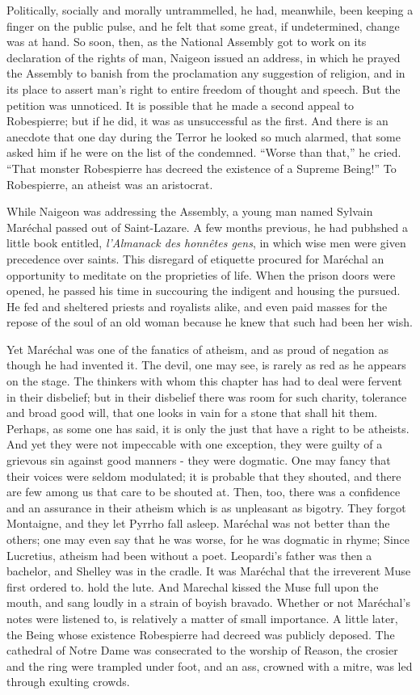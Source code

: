\documentclass[]{book}
\begin{document}
Politically, socially and morally untrammelled, he had, meanwhile, been
keeping a finger on the public pulse, and he felt that some great, if
undetermined, change was at hand. So soon, then, as the National
Assembly got to work on its declaration of the rights of man, Naigeon
issued an address, in which he prayed the Assembly to banish from the
proclamation any suggestion of religion, and in its place to assert
man's right to entire freedom of thought and speech. But the petition
was unnoticed. It is possible that he made a second appeal to
Robespierre; but if he did, it was as unsuccessful as the first. And
there is an anecdote that one day during the Terror he looked so much
alarmed, that some asked him if he were on the list of the condemned.
``Worse than that,'' he cried. ``That monster Robespierre has decreed
the existence of a Supreme Being!'' To Robespierre, an atheist was an
aristocrat.

While Naigeon was addressing the Assembly, a young man named Sylvain
Maréchal passed out of Saint-Lazare. A few months previous, he had
pubhshed a little book entitled, \emph{l'Almanack des honnêtes gens}, in
which wise men were given precedence over saints. This disregard of
etiquette procured for Maréchal an opportunity to meditate on the
proprieties of life. When the prison doors were opened, he passed his
time in succouring the indigent and housing the pursued. He fed and
sheltered priests and royalists alike, and even paid masses for the
repose of the soul of an old woman because he knew that such had been
her wish.

Yet Maréchal was one of the fanatics of atheism, and as proud of
negation as though he had invented it. The devil, one may see, is rarely
as red as he appears on the stage. The thinkers with whom this chapter
has had to deal were fervent in their disbelief; but in their disbelief
there was room for such charity, tolerance and broad good will, that one
looks in vain for a stone that shall hit them. Perhaps, as some one has
said, it is only the just that have a right to be atheists. And yet they
were not impeccable with one exception, they were guilty of a grievous
sin against good manners - they were dogmatic. One may fancy that their
voices were seldom modulated; it is probable that they shouted, and
there are few among us that care to be shouted at. Then, too, there was
a confidence and an assurance in their atheism which is as unpleasant as
bigotry. They forgot Montaigne, and they let Pyrrho fall asleep.
Maréchal was not better than the others; one may even say that he was
worse, for he was dogmatic in rhyme; Since Lucretius, atheism had been
without a poet. Leopardi's father was then a bachelor, and Shelley was
in the cradle. It was Maréchal that the irreverent Muse first ordered
to. hold the lute. And Marechal kissed the Muse full upon the mouth, and
sang loudly in a strain of boyish bravado. Whether or not Maréchal's
notes were listened to, is relatively a matter of small importance. A
little later, the Being whose existence Robespierre had decreed was
publicly deposed. The cathedral of Notre Dame was consecrated to the
worship of Reason, the crosier and the ring were trampled under foot,
and an ass, crowned with a mitre, was led through exulting crowds.
\end{document}
